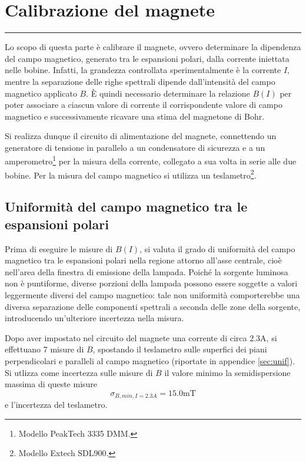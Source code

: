 {\centering
\section{Calibrazione del magnete}
}
\medskip
{\color{gray}\hrule}
\medskip
Lo scopo di questa parte è calibrare il magnete, ovvero determinare la dipendenza del campo magnetico, generato tra le espansioni polari, dalla corrente iniettata nelle bobine. Infatti, la grandezza controllata sperimentalmente è la corrente $I$, mentre la separazione delle righe spettrali dipende dall’intensità del campo magnetico applicato $B$. È quindi necessario determinare la relazione $B(I)$ per poter associare a ciascun valore di corrente il corrispondente valore di campo magnetico e successivamente ricavare una stima del magnetone di Bohr.

Si realizza dunque il circuito di alimentazione del magnete, connettendo un generatore di tensione in parallelo a un condensatore di sicurezza e a un amperometro\footnote{Modello PeakTech 3335 DMM.} per la misura della corrente, collegato a sua volta in serie alle due bobine. Per la misura del campo magnetico si utilizza un teslametro\footnote{Modello Extech SDL900.}.

\subsection{Uniformità del campo magnetico tra le espansioni polari}

Prima di eseguire le misure di $B(I)$, si valuta il grado di uniformità del campo magnetico tra le espansioni polari nella regione attorno all’asse centrale, cioè nell’area della finestra di emissione della lampada. Poiché la sorgente luminosa non è puntiforme, diverse porzioni della lampada possono essere soggette a valori leggermente diversi del campo magnetico: tale non uniformità comporterebbe una diversa separazione delle componenti spettrali a seconda delle zone della sorgente, introducendo un’ulteriore incertezza nella misura.

Dopo aver impostato nel circuito del magnete una corrente di circa $2.3$A, si effettuano 7 misure di $B$, spostando il teslametro sulle superfici dei piani perpendicolari e paralleli al campo magnetico (riportate in appendice \ref{sec:unif}).\\
Si utlizza come incertezza sulle misure di $B$ il valore minimo la
semidispersione massima di queste misure
$$\sigma_{B,min,I=2.3 A}= 15.0 \text{mT}$$
e l'incertezza del teslametro.

